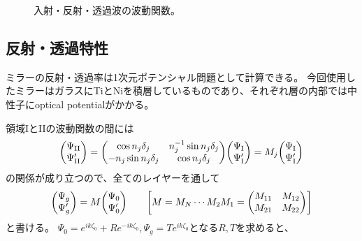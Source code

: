 \documentclass[dvipdfmx]{jsarticle}
\begin{document}
\begin{figure}
    \centering
    \caption{
        入射・反射・透過波の波動関数。
    }
    \label{fig: theoretical: alignment and wave fnc}
\end{figure}


\subsection{反射・透過特性}

ミラーの反射・透過率は1次元ポテンシャル問題として計算できる。
今回使用したミラーはガラスにTiとNiを積層しているものであり、それぞれ層の内部では中性子にoptical potentialがかかる。



領域IとIIの波動関数の間には
\begin{equation*}
    \mqty(\Psi_\mathrm{II} \\ \Psi_\mathrm{II}')
    =
    \mqty(
        \cos n_j\delta_j & n_j^{-1}\sin n_j\delta_j
        \\
        -n_j\sin n_j\delta_j & \cos n_j\delta_j
    )
    \mqty(\Psi_\mathrm{I} \\ \Psi_\mathrm{I}')
    =
    M_j
    \mqty(\Psi_\mathrm{I} \\ \Psi_\mathrm{I}')
\end{equation*}
の関係が成り立つので、全てのレイヤーを通して
\begin{equation*}
    \mqty(\Psi_g \\ \Psi_g')
    =
    M
    \mqty(\Psi_0 \\ \Psi_0')
    \qquad
    \qty[
        M=M_N\cdots M_2M_1
        =
        \mqty(M_{11} & M_{12} \\ M_{21} & M_{22})
    ]
\end{equation*}
と書ける。
$\Psi_0=e^{ik\zeta_0}+Re^{-ik\zeta_0}, \Psi_g=Te^{ik\zeta_0}$となる$R, T$を求めると、
\end{document}
